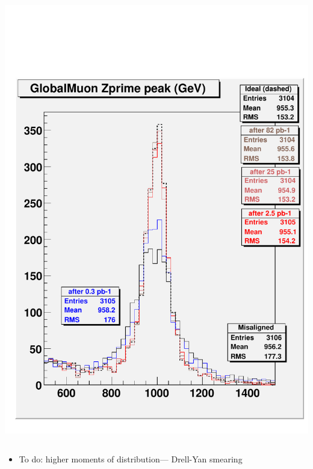\documentclass[compress]{beamer}
\begin{document}
\begin{frame}
\begin{columns}
\includegraphics[width=\linewidth]{checkit_globZprime.pdf}
\end{columns}

\vspace{0.25 cm}
\begin{itemize}
\item To do: higher moments of distribution--- Drell-Yan smearing
\end{itemize}
\vspace{-0.25 cm}
\mbox{ }
\end{frame}
\end{document}
